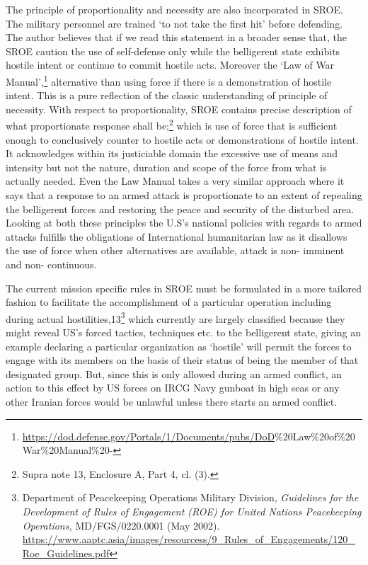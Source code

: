 \begin{multicols}{2}
\noi
The principle of proportionality and necessity are also incorporated in SROE. The military
personnel are trained ‘to not take the first hit’ before defending. The author believes that if
we read this statement in a broader sense that, the SROE caution the use of self-defense only
while the belligerent state exhibits hostile intent or continue to commit hostile acts.
Moreover the ‘Law of War Manual’,\footnote{\url{https://dod.defense.gov/Portals/1/Documents/pubs/DoD}\%20Law\%20of\%20War\%20Manual\%20-}
alternative than using force if there is a demonstration of hostile intent. This is a pure
reflection of the classic understanding of principle of necessity. With respect to
proportionality, SROE contains precise description of what proportionate response shall
be;\footnote{Supra note 13, Enclosure A, Part 4, cl. (3).}  which is use of force that is sufficient enough to conclusively counter to hostile acts or
demonstrations of hostile intent. It acknowledges within its justiciable domain the excessive
use of means and intensity but not the nature, duration and scope of the force from what is
actually needed. Even the Law Manual takes a very similar approach where it says that a
response to an armed attack is proportionate to an extent of repealing the belligerent forces
and restoring the peace and security of the disturbed area. Looking at both these principles
the U.S’s national policies with regards to armed attacks fulfills the obligations of
International humanitarian law as it disallows the use of force when other alternatives are
available, attack is non- imminent and non- continuous.

\noi
The current mission specific rules in SROE must be formulated in a more tailored fashion to
facilitate the accomplishment of a particular operation including during actual hostilities,13\footnote{Department of Peacekeeping Operations Military Division, \textit{Guidelines for the Development of Rules of
Engagement (ROE) for United Nations Peacekeeping Operations,} MD/FGS/0220.0001 (May 2002).
 \url{https://www.aaptc.asia/images/resourcess/9_Rules_of_Engagements/120_Roe_Guidelines.pdf}}
which currently are largely classified because they might reveal US’s forced tactics,
techniques etc. to the belligerent state, giving an example declaring a particular organization
as ‘hostile’ will permit the forces to engage with its members on the basis of their status of
being the member of that designated group. But, since this is only allowed during an armed
conflict, an action to this effect by US forces on IRCG Navy gunboat in high seas or any other
Iranian forces would be unlawful unless there starts an armed conflict.


\end{multicols}
